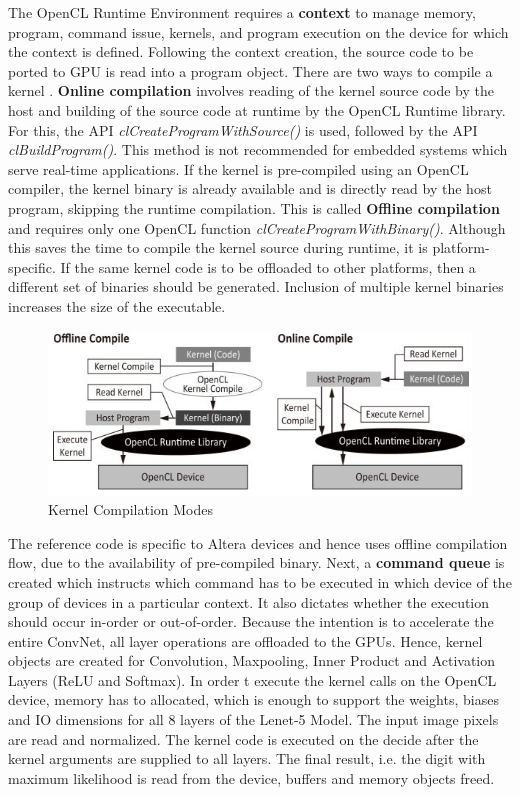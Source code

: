The OpenCL Runtime Environment requires a \textbf{context} to manage memory, program, command issue, kernels, and program execution on the device for which the context is defined. Following the context creation, the source code to be ported to GPU is read into a program object.\newline\newline
There are two ways to compile a kernel \cite{opencl_book_html}. \textbf{Online compilation} involves reading of the kernel source code by the host and building of the source code at runtime by the OpenCL Runtime library. For this, the API \textit{clCreateProgramWithSource()} is used, followed by the API \textit{clBuildProgram()}. This method is not recommended for embedded systems which serve real-time applications. If the kernel is pre-compiled using an OpenCL compiler, the kernel binary is already available and is directly read by the host program, skipping the runtime compilation. This is called \textbf{Offline compilation} and requires only one OpenCL function \textit{clCreateProgramWithBinary()}. Although this saves the time to compile the kernel source during runtime, it is platform-specific. If the same kernel code is to be offloaded to other platforms, then a different set of binaries should be generated. Inclusion of multiple kernel binaries increases the size of the executable.
\begin{figure}[h!]
\centering
\includegraphics[width=0.7\linewidth]{figures/kernel_compilation.PNG}
\caption{Kernel Compilation Modes \cite{opencl_book_html}}
\label{fig:kernel_compilation}
\end{figure}
The reference code \cite{mnist-altera-opencl} is specific to Altera devices and hence uses offline compilation flow, due to the availability of pre-compiled binary.\newline\newline
Next, a \textbf{command queue} is created which instructs which command has to be executed in which device of the group of devices in a particular context. It also dictates whether the execution should occur in-order or out-of-order. Because the intention is to accelerate the entire ConvNet, all layer operations are offloaded to the GPUs. Hence, kernel objects are created for Convolution, Maxpooling, Inner Product and Activation Layers (ReLU and Softmax). In order t execute the kernel calls on the OpenCL device, memory has to allocated, which is enough to support the weights, biases and IO dimensions for all 8 layers of the Lenet-5 Model.\newline\newline
The input image pixels are read and normalized. The kernel code is executed on the decide after the kernel arguments are supplied to all layers. The final result, i.e. the digit with maximum likelihood is read from the device, buffers and memory objects freed.
